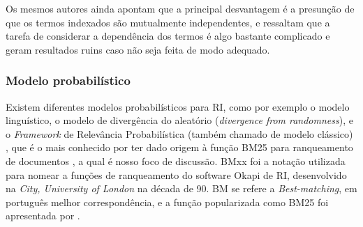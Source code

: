         Os mesmos autores ainda apontam que a principal desvantagem é a presunção de que os termos indexados são mutualmente independentes, e ressaltam que a tarefa de considerar a dependência dos termos é algo bastante complicado e geram resultados ruins caso não seja feita de modo adequado.
    
    \subsubsection{Modelo probabilístico}  \label{subsubsec:Modelo-probabilístico}
        Existem diferentes modelos probabilísticos para RI, como por exemplo o modelo linguístico, o modelo de divergência do aleatório (\textit{divergence from randomness}), e o \textit{Framework} de Relevância Probabilística (também chamado de modelo clássico) \cite[p.~87]{Zhai2016TDMA}, que é o mais conhecido por ter dado origem à função BM25 para ranqueamento de documentos \cite[p.~334--335]{robertson_probabilistic_2010} \cite[p.~111]{Zhai2016TDMA}, a qual é nosso foco de discussão.
        BMxx foi a notação utilizada para nomear a funções de ranqueamento do software Okapi de RI, desenvolvido na \textit{City, University of London} na década de 90. BM se refere a \textit{Best-matching}, em português melhor correspondência, e a função popularizada como BM25 foi apresentada por .
        
